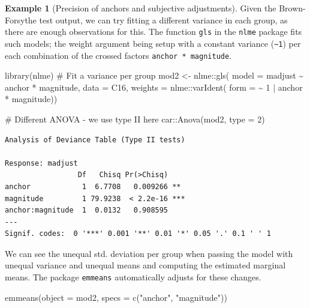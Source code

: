 \documentclass[
  11pt,
  letterpaper,
]{scrbook}
\newenvironment{Shaded}{\begin{snugshade}}{\end{snugshade}}
\newcommand{\AttributeTok}[1]{\textcolor[rgb]{0.40,0.45,0.13}{#1}}
\newcommand{\CommentTok}[1]{\textcolor[rgb]{0.37,0.37,0.37}{#1}}
\newcommand{\DecValTok}[1]{\textcolor[rgb]{0.68,0.00,0.00}{#1}}
\newcommand{\FunctionTok}[1]{\textcolor[rgb]{0.28,0.35,0.67}{#1}}
\newcommand{\NormalTok}[1]{\textcolor[rgb]{0.00,0.23,0.31}{#1}}
\newcommand{\OtherTok}[1]{\textcolor[rgb]{0.00,0.23,0.31}{#1}}
\newcommand{\SpecialCharTok}[1]{\textcolor[rgb]{0.37,0.37,0.37}{#1}}
\newcommand{\StringTok}[1]{\textcolor[rgb]{0.13,0.47,0.30}{#1}}
\theoremstyle{definition}
\theoremstyle{definition}
\newtheorem{example}{Example}[chapter]
\theoremstyle{remark}
\begin{document}
\begin{example}[Precision of anchors and subjective
adjustments]
Given the Brown-Forsythe test output, we can try fitting a different
variance in each group, as there are enough observations for this. The
function \texttt{gls} in the \texttt{nlme} package fits such models; the
weight argument being setup with a constant variance
(\texttt{\textasciitilde{}1}) per each combination of the crossed
factors \texttt{anchor\ *\ magnitude}.

\begin{Shaded}
\begin{Highlighting}[]
\FunctionTok{library}\NormalTok{(nlme)}
\CommentTok{\# Fit a variance per group}
\NormalTok{mod2 }\OtherTok{\textless{}{-}}\NormalTok{ nlme}\SpecialCharTok{::}\FunctionTok{gls}\NormalTok{(}
  \AttributeTok{model =}\NormalTok{ madjust }\SpecialCharTok{\textasciitilde{}}\NormalTok{ anchor }\SpecialCharTok{*}\NormalTok{ magnitude,}
  \AttributeTok{data =}\NormalTok{ C16,}
  \AttributeTok{weights =}\NormalTok{ nlme}\SpecialCharTok{::}\FunctionTok{varIdent}\NormalTok{(}
    \AttributeTok{form =} \SpecialCharTok{\textasciitilde{}} \DecValTok{1} \SpecialCharTok{|}\NormalTok{ anchor }\SpecialCharTok{*}\NormalTok{ magnitude))}

\CommentTok{\# Different ANOVA {-} we use type II here}
\NormalTok{car}\SpecialCharTok{::}\FunctionTok{Anova}\NormalTok{(mod2, }\AttributeTok{type =} \DecValTok{2}\NormalTok{)}
\end{Highlighting}
\end{Shaded}

\begin{verbatim}
Analysis of Deviance Table (Type II tests)

Response: madjust
                 Df   Chisq Pr(>Chisq)    
anchor            1  6.7708   0.009266 ** 
magnitude         1 79.9238  < 2.2e-16 ***
anchor:magnitude  1  0.0132   0.908595    
---
Signif. codes:  0 '***' 0.001 '**' 0.01 '*' 0.05 '.' 0.1 ' ' 1
\end{verbatim}

We can see the unequal std. deviation per group when passing the model
with unequal variance and unequal means and computing the estimated
marginal means. The package \texttt{emmeans} automatically adjusts for
these changes.

\begin{Shaded}
\begin{Highlighting}[]
\FunctionTok{emmeans}\NormalTok{(}\AttributeTok{object =}\NormalTok{ mod2, }
        \AttributeTok{specs =} \FunctionTok{c}\NormalTok{(}\StringTok{"anchor"}\NormalTok{, }\StringTok{"magnitude"}\NormalTok{))}
\end{Highlighting}
\end{Shaded}


\end{example}
\end{document}
